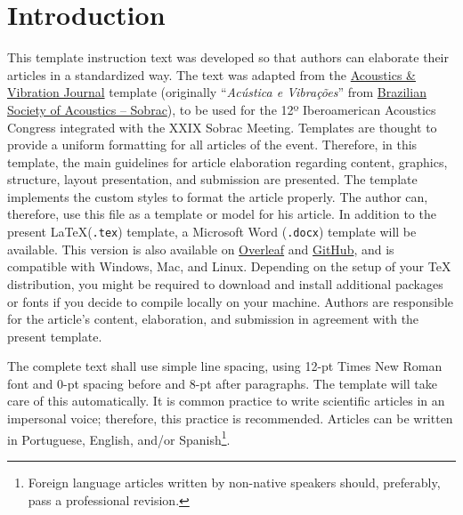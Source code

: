 \documentclass[12pt, a4paper, twoside, twocolumn]{article}
\begin{document}
 \setcounter{page}{1} 
\clearpage %

\section{Introduction}

This template instruction text was developed so that authors can elaborate their articles in a standardized way. The text was adapted from the \href{https://revista.acustica.org.br/acustica/user/setLocale/en_US?source=%2Facustica}{Acoustics \& Vibration Journal} template (originally ``\textit{Acústica e Vibrações}'' from \href{https://www.acustica.org.br/}{Brazilian Society of Acoustics -- Sobrac}), to be used for the 12º Iberoamerican Acoustics Congress integrated with the XXIX Sobrac Meeting. Templates are thought to provide a uniform formatting for all articles of the event. Therefore, in this template, the main guidelines for article elaboration regarding content, graphics, structure, layout presentation, and submission are presented. The template implements the custom styles to format the article properly. The author can, therefore, use this file as a template or model for his article. In addition to the present \LaTeX\xspace (\texttt{.tex}) template, a  Microsoft Word (\texttt{.docx}) template will be available. This version is also available on \href{https://www.overleaf.com/read/hgryywpgmxdx}{Overleaf} and \href{https://github.com/willdfonseca/fia2020}{GitHub}, and is compatible with Windows, Mac, and Linux. Depending on the setup of your TeX distribution, you might be required to download and install additional packages or fonts if you decide to compile locally on your machine. 
Authors are responsible for the article's content, elaboration, and submission in agreement with the present template.

The complete text shall use simple line spacing, using 12-pt Times New Roman font and 0-pt spacing before and 8-pt after paragraphs. The template will take care of this automatically. 
It is common practice to write scientific articles in an impersonal voice; therefore, this practice is recommended. Articles can be written in Portuguese, English, and/or Spanish\footnote{Foreign language articles written by non-native speakers should, preferably, pass a professional revision.}.
\end{document}
